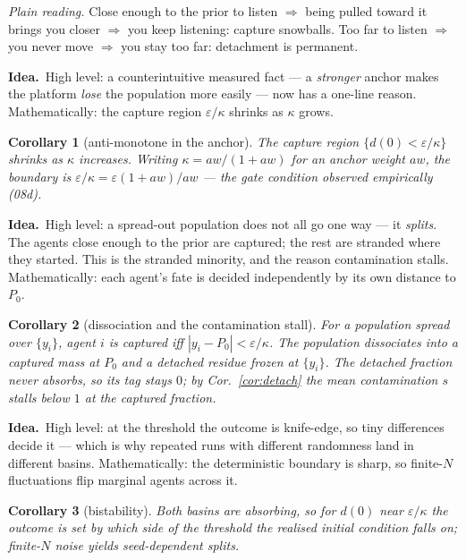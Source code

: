 \documentclass[11pt]{article}
\newtheorem{corollary}{Corollary}
\theoremstyle{definition}
\newcommand{\idea}[1]{\par\medskip\noindent\textbf{Idea.}\ #1\par\medskip}
\begin{document}
\noindent\emph{Plain reading.} Close enough to the prior to listen $\Rightarrow$ being
pulled toward it brings you closer $\Rightarrow$ you keep listening: capture snowballs.
Too far to listen $\Rightarrow$ you never move $\Rightarrow$ you stay too far: detachment
is permanent.

\idea{High level: a counterintuitive measured fact --- a \emph{stronger} anchor makes the
platform \emph{lose} the population more easily --- now has a one-line reason.
Mathematically: the capture region $\varepsilon/\kappa$ shrinks as $\kappa$ grows.}

\begin{corollary}[anti-monotone in the anchor]\label{cor:antimono}
The capture region $\{d(0)<\varepsilon/\kappa\}$ shrinks as $\kappa$ increases. Writing
$\kappa=aw/(1+aw)$ for an anchor weight $aw$, the boundary is
$\varepsilon/\kappa=\varepsilon(1+aw)/aw$ --- the gate condition observed empirically
(08d).
\end{corollary}

\idea{High level: a spread-out population does not all go one way --- it \emph{splits}.
The agents close enough to the prior are captured; the rest are stranded where they
started. This is the stranded minority, and the reason contamination stalls.
Mathematically: each agent's fate is decided independently by its own distance to $P_0$.}

\begin{corollary}[dissociation and the contamination stall]\label{cor:dissoc}
For a population spread over $\{y_i\}$, agent $i$ is captured iff
$|y_i-P_0|<\varepsilon/\kappa$. The population dissociates into a captured mass at $P_0$
and a detached residue frozen at $\{y_i\}$. The detached fraction never absorbs, so its
tag stays $0$; by Cor.~\ref{cor:detach} the mean contamination $s$ stalls below $1$ at
the captured fraction.
\end{corollary}

\idea{High level: at the threshold the outcome is knife-edge, so tiny differences decide
it --- which is why repeated runs with different randomness land in different basins.
Mathematically: the deterministic boundary is sharp, so finite-$N$ fluctuations flip
marginal agents across it.}

\begin{corollary}[bistability]\label{cor:bistable}
Both basins are absorbing, so for $d(0)$ near $\varepsilon/\kappa$ the outcome is set by
which side of the threshold the realised initial condition falls on; finite-$N$ noise
yields seed-dependent splits.
\end{corollary}
\end{document}
